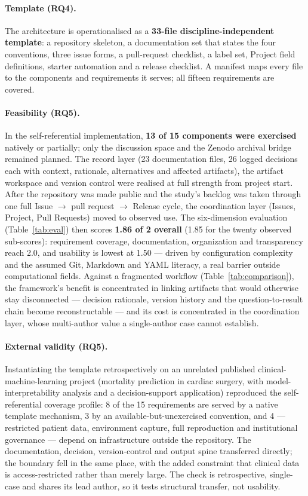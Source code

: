 \documentclass[pdflatex,sn-mathphys-num]{sn-jnl}%
\begin{document}
\paragraph{Template (RQ4).} The architecture is operationalised as a \textbf{33-file discipline-independent template}: a repository skeleton, a documentation set that states the four conventions, three issue forms, a pull-request checklist, a label set, Project field definitions, starter automation and a release checklist. A manifest maps every file to the components and requirements it serves; all fifteen requirements are covered.

\paragraph{Feasibility (RQ5).} In the self-referential implementation, \textbf{13 of 15 components were exercised} natively or partially; only the discussion space and the Zenodo archival bridge remained planned. The record layer (23 documentation files, 26 logged decisions each with context, rationale, alternatives and affected artifacts), the artifact workspace and version control were realised at full strength from project start. After the repository was made public and the study's backlog was taken through one full Issue $\rightarrow$ pull request $\rightarrow$ Release cycle, the coordination layer (Issues, Project, Pull Requests) moved to observed use. The six-dimension evaluation (Table~\ref{tab:eval}) then scores \textbf{1.86 of 2 overall} (1.85 for the twenty observed sub-scores): requirement coverage, documentation, organization and transparency reach 2.0, and usability is lowest at 1.50 --- driven by configuration complexity and the assumed Git, Markdown and YAML literacy, a real barrier outside computational fields. Against a fragmented workflow (Table~\ref{tab:comparison}), the framework's benefit is concentrated in linking artifacts that would otherwise stay disconnected --- decision rationale, version history and the question-to-result chain become reconstructable --- and its cost is concentrated in the coordination layer, whose multi-author value a single-author case cannot establish.

\paragraph{External validity (RQ5).} Instantiating the template retrospectively on an unrelated published clinical-machine-learning project (mortality prediction in cardiac surgery, with model-interpretability analysis and a decision-support application) reproduced the self-referential coverage profile: 8 of the 15 requirements are served by a native template mechanism, 3 by an available-but-unexercised convention, and 4 --- restricted patient data, environment capture, full reproduction and institutional governance --- depend on infrastructure outside the repository. The documentation, decision, version-control and output spine transferred directly; the boundary fell in the same place, with the added constraint that clinical data is access-restricted rather than merely large. The check is retrospective, single-case and shares its lead author, so it tests structural transfer, not usability.
\end{document}
